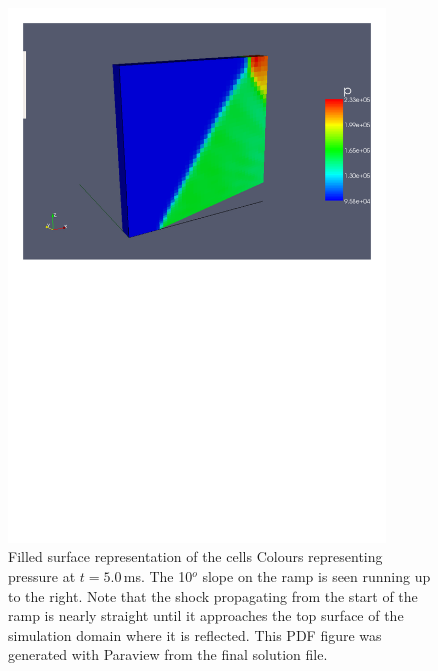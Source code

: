 \begin{figure}[htbp]
\begin{center}
\includegraphics[width=10cm,viewport=27 444 571 818]{../3D/simple_ramp/simple-ramp-p.pdf}
\end{center}
\caption{Filled surface representation of the cells
  Colours representing pressure at $t = 5.0$\,ms.
  The 10$^o$ slope on the ramp is seen running up to the right.
  Note that the shock propagating from the start of the ramp is nearly
  straight until it approaches the top surface of the simulation domain where
  it is reflected.
  This PDF figure was generated with Paraview from the final solution file.}
\label{simple-ramp-p-fig}
\end{figure}

